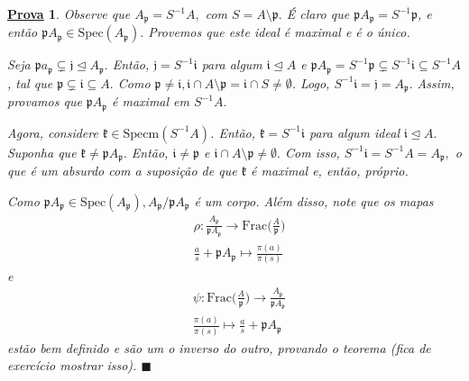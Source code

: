 \documentclass{article}
\newtheorem*{proof*}{\underline{Prova}}
\renewcommand\qedsymbol{$\blacksquare$}
\begin{document}
    \begin{proof*}
      Observe que \(A_{\mathfrak{p}}=S^{-1}A,\) com \(S=A\setminus{\mathfrak{p}}.\) É claro que \(\mathfrak{p}A_{\mathfrak{p}} = S^{-1}\mathfrak{p}\), e então
      \(\mathfrak{p}A_{\mathfrak{p}}\in \mathrm{Spec}(A_{\mathfrak{p}}).\) Provemos que este ideal é maximal e é o único.

      Seja \(\mathfrak{p}a_{\mathfrak{p}}\subsetneq \mathfrak{j}\trianglelefteq{A_{\mathfrak{p}}}. \) Então, \(\mathfrak{j} = S^{-1}\mathfrak{i}\) para algum \(\mathfrak{i}\trianglelefteq{A}\) e 
      \(\mathfrak{p}A_{\mathfrak{p}} = S^{-1}\mathfrak{p}\subsetneq S^{-1}\mathfrak{i}\subseteq S^{-1}A \), tal que \(\mathfrak{p}\subsetneq \mathfrak{i}\subseteq A. \)
      Como \(\mathfrak{p}\neq \mathfrak{i}, \mathfrak{i}\cap A\setminus{\mathfrak{p}} = \mathfrak{i}\cap S \neq\emptyset\). Logo,
      \(S^{-1}\mathfrak{i} = \mathfrak{j} = A_{\mathfrak{p}}.\) Assim, provamos que \(\mathfrak{p}A_{\mathfrak{p}}\) é maximal em \(S^{-1}A.\) 

      Agora, considere \(\mathfrak{k}\in \mathrm{Specm}(S^{-1}A)\). Então, \(\mathfrak{k} = S^{-1}\mathfrak{i}\) para algum ideal 
      \(\mathfrak{i}\trianglelefteq{A}.\) Suponha que \(\mathfrak{k}\neq \mathfrak{p}A_{\mathfrak{p}}.\) Então, \(\mathfrak{i}\neq \mathfrak{p}\) e
      \(\mathfrak{i}\cap A\setminus{\mathfrak{p}}\neq\emptyset.\) Com isso, \(S^{-1}\mathfrak{i} = S^{-1}A = A_{\mathfrak{p}},\) o que é um absurdo com a
      suposição de que \(\mathfrak{k}\) é maximal e, então, próprio.

      Como \(\mathfrak{p}A_{\mathfrak{p}}\in \mathrm{Spec}(A_{\mathfrak{p}}), A_{\mathfrak{p}}/\mathfrak{p}A_{\mathfrak{p}}\) é um corpo. Além disso,
      note que os mapas 
      \begin{align*}
  &\rho :\frac{A_{\mathfrak{p}}}{\mathfrak{p}A_{\mathfrak{p}}}\rightarrow \mathrm{Frac}\biggl(\frac{A}{\mathfrak{p}}\biggr)\\
  &\frac{a}{s} + \mathfrak{p}A_{\mathfrak{p}}\mapsto \frac{\pi (a)}{\pi (s)}
      \end{align*}
      e
      \begin{align*}
  &\psi:\mathrm{Frac}\biggl(\frac{A}{\mathfrak{p}}\biggr)\rightarrow \frac{A_{\mathfrak{p}}}{\mathfrak{p}A_{\mathfrak{p}}}\\
  &\frac{\pi (a)}{\pi (s)}\mapsto \frac{a}{s} + \mathfrak{p}A_{\mathfrak{p}}
      \end{align*}
      estão bem definido e são um o inverso do outro, provando o teorema (fica de exercício mostrar isso). \qedsymbol
    \end{proof*}
\end{document}
